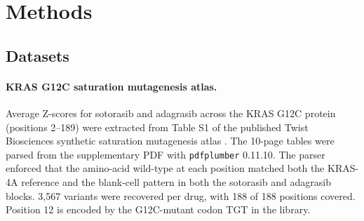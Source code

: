 \documentclass[11pt,a4paper]{article}
\begin{document}
\section{Methods}

\subsection{Datasets}

\paragraph{KRAS G12C saturation mutagenesis atlas.}
Average Z-scores for sotorasib and adagrasib across the KRAS G12C protein
(positions 2--189) were extracted from Table S1 of the published Twist
Biosciences synthetic saturation mutagenesis atlas \citep{feng2022}.
The 10-page tables were parsed from the supplementary PDF with
\texttt{pdfplumber} 0.11.10. The parser enforced that the amino-acid
wild-type at each position matched both the KRAS-4A reference and the
blank-cell pattern in both the sotorasib and adagrasib blocks. 3,567
variants were recovered per drug, with 188 of 188 positions covered.
Position 12 is encoded by the G12C-mutant codon TGT in the library.
\end{document}
